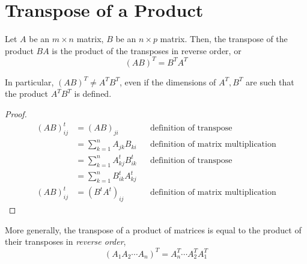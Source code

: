 \documentclass[letterpaper,12pt]{article}
\begin{document}
\section*{Transpose of a Product}
\begin{theorem}
Let $A$ be an $m \times n$ matrix, $B$ be an $n \times p$ matrix. Then, the transpose of the product $BA$ is the product of the transposes in reverse order, or
\begin{equation*}
    \boxed{(AB)^T = B^T A^T}
\end{equation*}
\end{theorem}

In particular, $(AB)^T \neq A^T B^T$, even if the dimensions of $A^T, B^T$ are such that the product $A^T B^T$ is defined.

\begin{proof}
\begin{align*}
    (AB)^t_{ij} & = (AB)_{ji} && \text{definition of transpose} \\
    & = \sum_{k=1}^n A_{jk} B_{ki} && \text{definition of matrix multiplication} \\
    & = \sum_{k=1}^n A^t_{kj} B^t_{ik} && \text{definition of transpose} \\
    & = \sum_{k=1}^n B^t_{ik} A^t_{kj} \\
    (AB)^t_{ij} & = (B^t A^t)_{ij} && \text{definition of matrix multiplication}
\end{align*}
\end{proof}

More generally, the transpose of a product of matrices is equal to the product of their transposes in \textit{reverse order},
\begin{equation*}
    \boxed{(A_1 A_2 \cdots A_n)^T = A_n^T \cdots A_2^T A_1^T}
\end{equation*}
\end{document}
